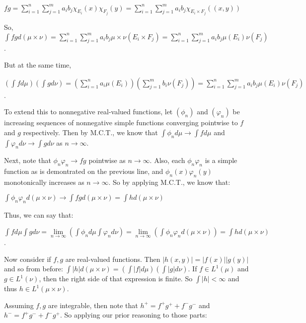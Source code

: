 \documentclass{book}
\newenvironment{myIndent}{%
   \begin{adjustwidth}{2.5em}{0em}%
}{%
   \end{adjustwidth}%
}
\newcommand{\retTwo}{\hfill\bigbreak}
\begin{document}
\begin{enumerate}
\begin{myIndent}
		{\centering $fg = \sum\limits_{i = 1}^n \sum\limits_{j = 1}^m a_ib_j\chi_{E_i}(x)\chi_{F_j}(y) = \sum\limits_{i=1}^n\sum\limits_{j=1}^m a_i b_j \chi_{E_i \times F_j}((x, y))$ \retTwo\par}

		\newpage

		So, $\int fg d(\mu \times \nu) = \sum\limits_{i=1}^n \sum\limits_{j=1}^m a_i b_j \mu \times \nu(E_i \times F_j) = \sum\limits_{i=1}^n \sum\limits_{j=1}^m a_i b_j \mu(E_i)\nu(F_j)$.\retTwo

		But at the same time, 
		
		{\centering $(\int f d\mu)(\int g d\nu) = (\sum\limits_{i=1}^n a_i\mu(E_i))(\sum\limits_{j=1}^m b_i\nu(F_j)) = \sum\limits_{i=1}^n \sum\limits_{j=1}^m a_i b_j \mu(E_i)\nu(F_j)$.\retTwo\par}

		To extend this to nonnegative real-valued functions, let $(\phi_n)$ and $(\varphi_n)$ be increasing sequences of nonnegative simple functions converging pointwise to $f$ and $g$ respectively. Then by M.C.T., we know that $\int \phi_n d\mu \rightarrow \int f d\mu$ and $\int \varphi_n d\nu \rightarrow \int gd\nu$ as $n \rightarrow \infty$.\retTwo

		Next, note that $\phi_n\varphi_n \rightarrow fg$ pointwise as $n \rightarrow \infty$. Also, each $\phi_n\varphi_n$ is a simple function as is demontrated on the previous line, and $\phi_n(x)\varphi_n(y)$ monotonically increases as $n \rightarrow \infty$. So by applying M.C.T., we know that:

		{\centering $\int \phi_n \varphi_n d(\mu \times \nu) \rightarrow \int fg d(\mu \times \nu) = \int h d(\mu \times \nu)$ \retTwo\par}

		Thus, we can say that:

		{\centering $\int f d\mu \int g d\nu = \lim\limits_{n \rightarrow \infty} (\int \phi_n d\mu \int \varphi_n d\nu) = \lim\limits_{n \rightarrow \infty} (\int \phi_n \varphi_n d(\mu \times \nu)) = \int h d(\mu \times \nu)$. \retTwo\par}

		Now consider if $f, g$ are real-valued functions. Then $|h(x, y)| = |f(x)||g(y)|$ and so from before: $\int |h| d(\mu \times \nu) = (\int |f| d\mu)(\int |g|d\nu)$. If $f \in L^1(\mu)$ and $g \in L^1(\nu)$, then the right side of that expression is finite. So $\int |h| < \infty$ and thus $h \in L^1(\mu \times \nu)$.\retTwo

		Assuming $f, g$ are integrable, then note that $h^+ = f^+g^+ + f^-g^-$ and $h^- = f^+g^- + f^-g^+$. So applying our prior reasoning to those parts:


\end{myIndent}
\end{enumerate}
\end{document}
